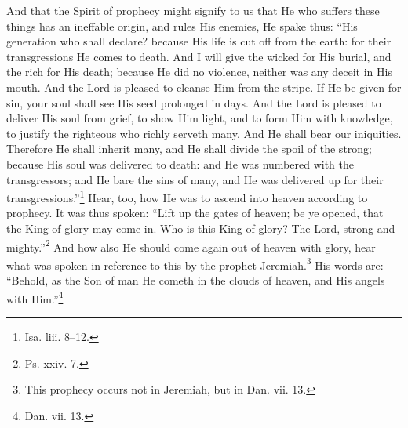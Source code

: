 And that the Spirit of prophecy might signify to us that He who suffers these things has an ineffable origin, and rules His enemies, He spake thus: “His generation who shall declare? because His life is cut off from the earth: for their transgressions He comes to death. And I will give the wicked for His burial, and the rich for His death; because He did no violence, neither was any deceit in His mouth. And the Lord is pleased to cleanse Him from the stripe. If He be given for sin, your soul shall see His seed  prolonged in days. And the Lord is pleased to deliver His soul from grief, to show Him light, and to form Him with knowledge, to justify the righteous who richly serveth many. And He shall bear our iniquities. Therefore He shall inherit many, and He shall divide the spoil of the strong; because His soul was delivered to death: and He was numbered with the transgressors; and He bare the sins of many, and He was delivered up for their transgressions.”\footnote{Isa. liii. 8–12.} Hear, too, how He was to ascend into heaven according to prophecy. It was thus spoken: “Lift up the gates of heaven; be ye opened, that the King of glory may come in. Who is this King of glory? The Lord, strong and mighty.”\footnote{Ps. xxiv. 7.} And how also He should come again out of heaven with glory, hear what was spoken in reference to this by the prophet Jeremiah.\footnote{This prophecy occurs not in Jeremiah, but in Dan. vii. 13.} His words are: “Behold, as the Son of man He cometh in the clouds of heaven, and His angels with Him.”\footnote{Dan. vii. 13.}


